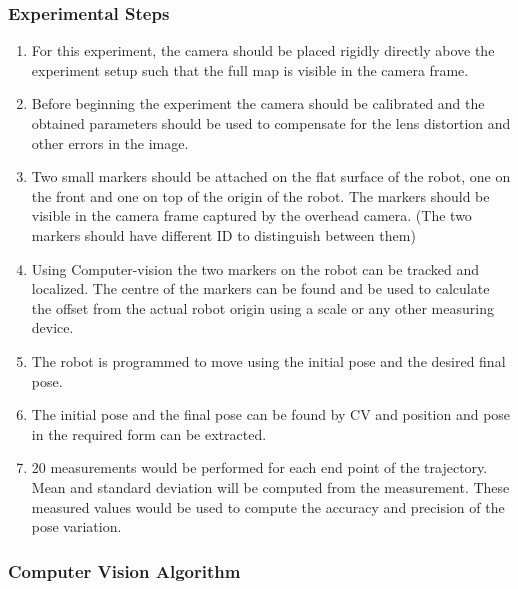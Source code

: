	\subsubsection{Experimental Steps}
	
\begin{enumerate}
	\item
	For this experiment, the camera should be placed rigidly directly above the experiment setup such that the full map is visible in the camera frame. 
	\item
	Before beginning the experiment the camera should be calibrated and the obtained parameters should be used to compensate for the lens distortion and other errors in the image. 
	\item
	Two small markers should be attached on the flat surface of the robot, one on the front and one on top of the origin of the robot. The markers should be visible in the camera frame captured by the overhead camera. (The two markers should have different ID to distinguish between them)
	\item
    Using Computer-vision the two markers on the robot can be tracked and localized. The centre of the markers can be found and be used to calculate the offset from the actual robot origin using a scale or any other measuring device.
	\item
	The robot is programmed to move using the initial pose and the desired final pose.
	\item
	The initial pose and the final pose can be found by CV and position and pose in the required form can be extracted.
	\item
	20 measurements would be performed for each end point of the trajectory. Mean and standard deviation will be computed from the measurement. These measured values would be used to compute the accuracy and precision of the pose variation. 
	
\end{enumerate}
\vspace{0.5cm}

\subsubsection{Computer Vision Algorithm}

